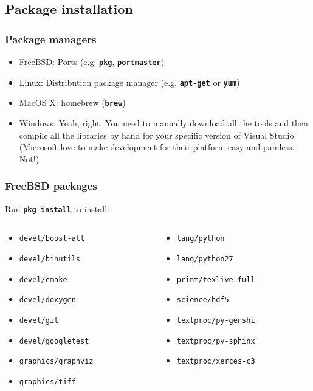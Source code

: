 \documentclass{beamer}
\newcommand{\cmd}[1]{\textbf{\texttt{#1}}}
\newcommand{\pkg}[1]{\texttt{#1}}
\begin{document}
\subsection{Package installation}
\begin{frame}
  \frametitle{Package managers}
  \begin{itemize}
  \item FreeBSD: Ports (e.g. \cmd{pkg}, \cmd{portmaster})
  \item Linux: Distribution package manager (e.g. \cmd{apt-get} or \cmd{yum})
  \item MacOS X: homebrew (\cmd{brew})
  \item Windows: Yeah, right.  You need to manually download all the
    tools and then compile all the libraries by hand for your specific
    version of Visual Studio.  (Microsoft love to make development for
    their platform easy and painless.  Not!)
  \end{itemize}
\end{frame}

\begin{frame}
  \frametitle{FreeBSD packages}
  \scriptsize
  Run \cmd{pkg install} to install:
  \begin{columns}
    \begin{column}{.5\linewidth}
      \begin{itemize}
      \item[] \pkg{devel/boost-all}
      \item[] \pkg{devel/binutils}
      \item[] \pkg{devel/cmake}
      \item[] \pkg{devel/doxygen}
      \item[] \pkg{devel/git}
      \item[] \pkg{devel/googletest}
      \item[] \pkg{graphics/graphviz}
      \item[] \pkg{graphics/tiff}
      \end{itemize}
      \end{column}
    \begin{column}{.5\linewidth}
    \begin{itemize}
      \item[] \pkg{lang/python}
      \item[] \pkg{lang/python27}
      \item[] \pkg{print/texlive-full}
      \item[] \pkg{science/hdf5}
      \item[] \pkg{textproc/py-genshi}
      \item[] \pkg{textproc/py-sphinx}
      \item[] \pkg{textproc/xerces-c3}
    \end{itemize}
    \end{column}
  \end{columns}
\end{frame}
\end{document}
